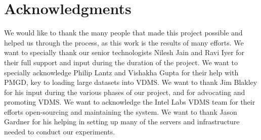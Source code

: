 
\section{Acknowledgments}

We would like to thank the many people that made this project possible and
helped us through the process, as this work is the results of many efforts.
We want to specially thank our senior technologists Nilesh Jain and
Ravi Iyer for their full support and input during the duration of the project.
We want to specially acknowledge Philip Lantz and Vishakha Gupta for their help
with PMGD, key to loading large datasets into VDMS.
We want to thank Jim Blakley for his input during the various
phases of our project, and for advocating and promoting VDMS.
We want to acknowledge the Intel Labs VDMS team for their efforts
open-sourcing and maintaining the system.
We want to thank Jason Gardner for his helping in setting up many of
the servers and infrastructure needed to conduct our experiments.
